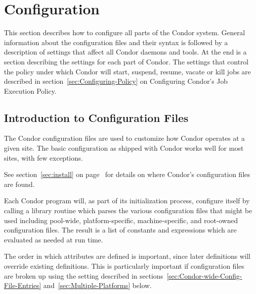 \section{\label{sec:Configuring-Condor}
Configuration}


This section describes how to configure all parts of the Condor
system.  General information about the configuration
files and their syntax is followed by a description of
settings that affect all
Condor daemons and tools.  At the end is a section describing the
settings for each part of Condor.  The 
settings that control the policy under which Condor will start,
suspend, resume, vacate or kill jobs
are described in 
section~\ref{sec:Configuring-Policy} on Configuring Condor's Job
Execution Policy. 

\subsection{\label{sec:Intro-to-Config-Files}
Introduction to Configuration Files}

The Condor configuration files are used to customize how Condor
operates at a given site.  The basic configuration as shipped with
Condor works well for most sites, with few exceptions.

See section~\ref{sec:install} on
page~\pageref{sec:install}
for details on where
Condor's configuration files are found.

Each Condor program will, as part of its initialization process,
configure itself by calling a library routine which parses the
various configuration files that might be used including pool-wide,
platform-specific, machine-specific, and root-owned configuration files.
The result is a list of constants and expressions which are
evaluated as needed at run time.

The order in which attributes are defined is important, since later
definitions will override existing definitions.
This is particularly important if configuration files are broken up
using the  setting described in
sections~\ref{sec:Condor-wide-Config-File-Entries}
and~\ref{sec:Multiple-Platforms} below.

